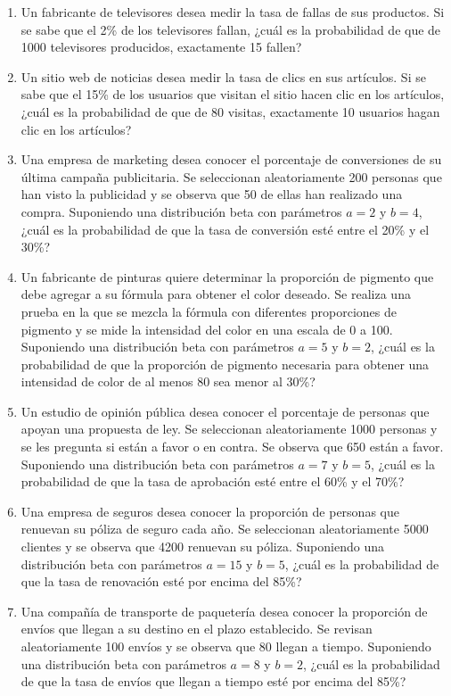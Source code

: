 \begin{Ejer}
\begin{enumerate}
    \item Un fabricante de televisores desea medir la tasa de fallas de sus productos. Si se sabe que el 2\% de los televisores fallan, ¿cuál es la probabilidad de que de 1000 televisores producidos, exactamente 15 fallen?

    \item Un sitio web de noticias desea medir la tasa de clics en sus artículos. Si se sabe que el 15\% de los usuarios que visitan el sitio hacen clic en los artículos, ¿cuál es la probabilidad de que de 80 visitas, exactamente 10 usuarios hagan clic en los artículos?

    \item Una empresa de marketing desea conocer el porcentaje de conversiones de su última campaña publicitaria. Se seleccionan aleatoriamente 200 personas que han visto la publicidad y se observa que 50 de ellas han realizado una compra. Suponiendo una distribución beta con parámetros $a=2$ y $b=4$, ¿cuál es la probabilidad de que la tasa de conversión esté entre el 20\% y el 30\%?

    \item Un fabricante de pinturas quiere determinar la proporción de pigmento que debe agregar a su fórmula para obtener el color deseado. Se realiza una prueba en la que se mezcla la fórmula con diferentes proporciones de pigmento y se mide la intensidad del color en una escala de 0 a 100. Suponiendo una distribución beta con parámetros $a=5$ y $b=2$, ¿cuál es la probabilidad de que la proporción de pigmento necesaria para obtener una intensidad de color de al menos 80 sea menor al 30\%?

    \item Un estudio de opinión pública desea conocer el porcentaje de personas que apoyan una propuesta de ley. Se seleccionan aleatoriamente 1000 personas y se les pregunta si están a favor o en contra. Se observa que 650 están a favor. Suponiendo una distribución beta con parámetros $a=7$ y $b=5$, ¿cuál es la probabilidad de que la tasa de aprobación esté entre el 60\% y el 70\%?

    \item Una empresa de seguros desea conocer la proporción de personas que renuevan su póliza de seguro cada año. Se seleccionan aleatoriamente 5000 clientes y se observa que 4200 renuevan su póliza. Suponiendo una distribución beta con parámetros $a=15$ y $b=5$, ¿cuál es la probabilidad de que la tasa de renovación esté por encima del 85\%?

    \item Una compañía de transporte de paquetería desea conocer la proporción de envíos que llegan a su destino en el plazo establecido. Se revisan aleatoriamente 100 envíos y se observa que 80 llegan a tiempo. Suponiendo una distribución beta con parámetros $a=8$ y $b=2$, ¿cuál es la probabilidad de que la tasa de envíos que llegan a tiempo esté por encima del 85\%?

\end{enumerate}
\end{Ejer} 


